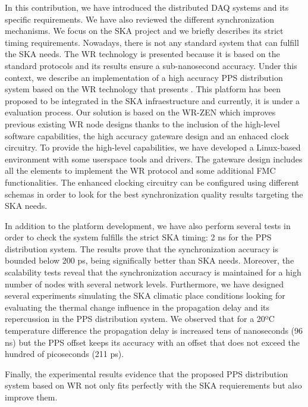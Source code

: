 In this contribution, we have introduced the distributed DAQ systems and its specific requirements. We have also reviewed the different synchronization mechanisms. We focus on the SKA project and we briefly describes its strict timing requirements. Nowadays, there is not any standard system that can fulfill the SKA needs. The WR technology is presented because it is based on the standard protocols and its results ensure a sub-nanosecond accuracy. Under this context, we describe an implementation of a high accuracy PPS distribution system based on the WR technology that presents . This platform has been proposed to be integrated in the SKA infraestructure and currently, it is under a evaluation process. 
Our solution is based on the WR-ZEN which improves previous existing WR node designs 
thanks to the inclusion of the high-level software capabilities, the high accuracy gateware
design and an enhaced clock circuitry.
To provide the high-level capabilities, we have developed a Linux-based environment with some
userspace tools and drivers. The gateware design includes all the elements to implement the 
WR protocol and some additional FMC functionalities. The enhanced clocking circuitry can be configured using different schemas in order to look for the best synchronization quality results targeting the SKA needs. 

In addition to the platform development, we have also perform several tests in order to check the system fulfills the strict SKA timing: 2 ns for the PPS distribution system. The results prove that the synchronization accuracy is bounded below 200 ps, being significally better than SKA needs. Moreover, the scalability tests reveal that the synchronization accuracy is maintained for a high number of nodes with several network levels. Furthermore, we have 
designed several experiments simulating the SKA climatic place conditions 
looking for evaluating the thermal change influence in the propagation delay 
and its repercussion in the PPS distribution system. We observed that for a 
20ºC temperature difference the propagation delay is increased tens of 
nanoseconds (96 ns) but the PPS offset keeps its accuracy with an offset that 
does not exceed the hundred of picoseconds (211 ps). 

Finally, the experimental results evidence that the proposed PPS distribution system based on WR not only fits perfectly with the SKA requierements but also improve them.


